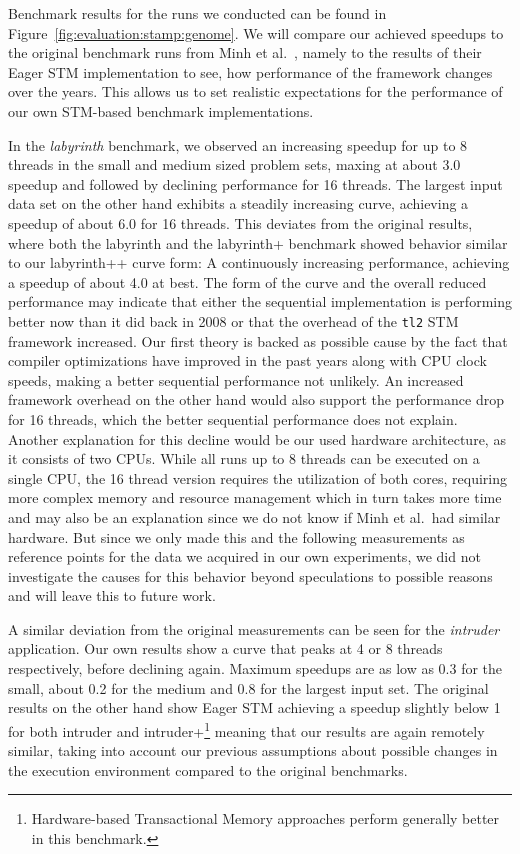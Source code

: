 Benchmark results for the runs we conducted can be found in Figure~\ref{fig:evaluation:stamp:genome}.
We will compare our achieved speedups to the original benchmark runs from Minh et al.~\cite{minh2008stamp}, namely to the results of their Eager STM implementation to see, how performance of the framework changes over the years.
This allows us to set realistic expectations for the performance of our own STM-based benchmark implementations.

In the \emph{labyrinth} benchmark, we observed an increasing speedup for up to 8 threads in the small and medium sized problem sets, maxing at about 3.0 speedup and followed by declining performance for 16 threads.
The largest input data set on the other hand exhibits a steadily increasing curve, achieving a speedup of about 6.0 for 16 threads.
This deviates from the original results, where both the labyrinth and the labyrinth+ benchmark showed behavior similar to our labyrinth++ curve form: A continuously increasing performance, achieving a speedup of about 4.0 at best.
The form of the curve and the overall reduced performance may indicate that either the sequential implementation is performing better now than it did back in 2008 or that the overhead of the \texttt{tl2} STM framework increased.
Our first theory is backed as possible cause by the fact that compiler optimizations have improved in the past years along with CPU clock speeds, making a better sequential performance not unlikely.
An increased framework overhead on the other hand would also support the performance drop for 16 threads, which the better sequential performance does not explain.
Another explanation for this decline would be our used hardware architecture, as it consists of two CPUs.
While all runs up to 8 threads can be executed on a single CPU, the 16 thread version requires the utilization of both cores, requiring more complex memory and resource management which in turn takes more time and may also be an explanation since we do not know if Minh et al.\ had similar hardware.
But since we only made this and the following measurements as reference points for the data we acquired in our own experiments, we did not investigate the causes for this behavior beyond speculations to possible reasons and will leave this to future work.

A similar deviation from the original measurements can be seen for the \emph{intruder} application.
Our own results show a curve that peaks at 4 or 8 threads respectively, before declining again.
Maximum speedups are as low as 0.3 for the small, about 0.2 for the medium and 0.8 for the largest input set.
The original results on the other hand show Eager STM achieving a speedup slightly below 1 for both intruder and intruder+\footnote{Hardware-based Transactional Memory approaches perform generally better in this benchmark.} meaning that our results are again remotely similar, taking into account our previous assumptions about possible changes in the execution environment compared to the original benchmarks.

